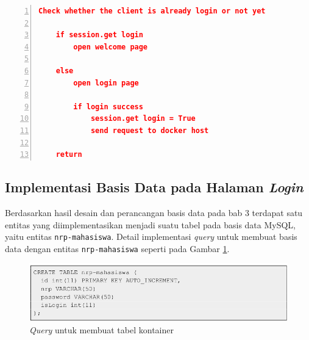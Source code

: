 \begin{minipage}{\linewidth}  
	\begin{lstlisting}[numbers=left, frame=single,tabsize=2,breaklines,caption={Pseudocode Web Service},label=pseudocodehalamanlogin,language=json]
	Check whether the client is already login or not yet
	
	if session.get login
		open welcome page
		
	else
		open login page
		
		if login success
			session.get login = True
			send request to docker host
	
	return  	
	\end{lstlisting}
\end{minipage}


\subsection{Implementasi Basis Data pada Halaman \textit{Login}}
Berdasarkan hasil desain dan perancangan basis data pada bab 3 terdapat satu entitas yang diimplementasikan menjadi suatu tabel pada basis data MySQL, yaitu entitas \texttt{nrp-mahasiswa}. Detail implementasi \textit{query} untuk membuat basis data dengan entitas \texttt{nrp-mahasiswa} seperti pada Gambar \ref{querynrpmahasiswa}.\\
\begin{figure}[H]
	\centering
	\includegraphics[width=\linewidth]{images/bab4/querynrpmahasiswa}
	\caption{\textit{Query} untuk membuat tabel kontainer}
	\label{querynrpmahasiswa}
\end{figure}


